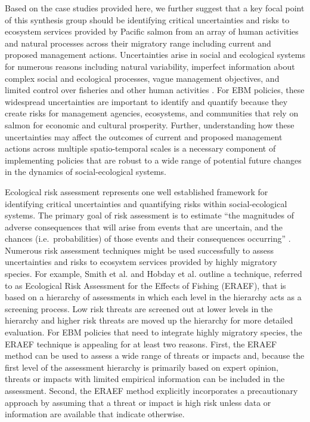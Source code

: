 Based on the case studies provided here, we further suggest that a key
focal point of this synthesis group should be identifying critical
uncertainties and risks to ecosystem services provided by Pacific salmon
from an array of human activities and natural processes across their
migratory range including current and proposed management actions.
Uncertainties arise in social and ecological systems for numerous
reasons including natural variability, imperfect information about
complex social and ecological processes, vague management objectives,
and limited control over fisheries and other human activities
\citep{Peterman2004a}. For EBM policies, these widespread uncertainties
are important to identify and quantify because they create risks for
management agencies, ecosystems, and communities that rely on salmon for
economic and cultural prosperity. Further, understanding how these
uncertainties may affect the outcomes of current and proposed management
actions across multiple spatio-temporal scales is a necessary component
of implementing policies that are robust to a wide range of potential
future changes in the dynamics of social-ecological systems.

Ecological risk assessment represents one well established framework for
identifying critical uncertainties and quantifying risks within
social-ecological systems. The primary goal of risk assessment is to
estimate ``the magnitudes of adverse consequences that will arise from
events that are uncertain, and the chances (i.e.~probabilities) of those
events and their consequences occurring'' \citep{Peterman2004a}.
Numerous risk assessment techniques might be used successfully to assess
uncertainties and risks to ecosystem services provided by highly
migratory species. For example, Smith et al. \citet{Smith2007} and
Hobday et al. \citet{Hobday2011} outline a technique, referred to as
Ecological Risk Assessment for the Effects of Fishing (ERAEF), that is
based on a hierarchy of assessments in which each level in the hierarchy
acts as a screening process. Low risk threats are screened out at lower
levels in the hierarchy and higher risk threats are moved up the
hierarchy for more detailed evaluation. For EBM policies that need to
integrate highly migratory species, the ERAEF technique is appealing for
at least two reasons. First, the ERAEF method can be used to assess a
wide range of threats or impacts and, because the first level of the
assessment hierarchy is primarily based on expert opinion, threats or
impacts with limited empirical information can be included in the
assessment. Second, the ERAEF method explicitly incorporates a
precautionary approach by assuming that a threat or impact is high risk
unless data or information are available that indicate otherwise.

